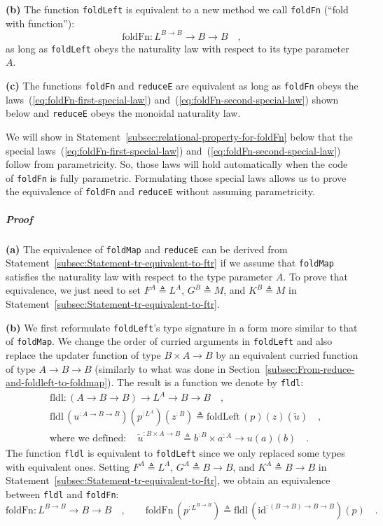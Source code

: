 \textbf{(b)} The function \lstinline!foldLeft! is equivalent to a
new method we call \lstinline!foldFn! (\textsf{``}fold with function\textsf{''}):
\[
\text{foldFn}:L^{B\rightarrow B}\rightarrow B\rightarrow B\quad,
\]
as long as \lstinline!foldLeft! obeys the naturality law with respect
to its type parameter $A$.

\textbf{(c)} The functions \lstinline!foldFn! and \lstinline!reduceE!
are equivalent as long as \lstinline!foldFn! obeys the laws~(\ref{eq:foldFn-first-special-law})
and~(\ref{eq:foldFn-second-special-law}) shown below and \lstinline!reduceE!
obeys the monoidal naturality law. 

We will show in Statement~\ref{subsec:relational-property-for-foldFn}
below that the special laws~(\ref{eq:foldFn-first-special-law})
and~(\ref{eq:foldFn-second-special-law}) follow from parametricity.
So, those laws will hold automatically when the code of \lstinline!foldFn!
is fully parametric. Formulating those special laws allows us to prove
the equivalence of \lstinline!foldFn! and \lstinline!reduceE! without
assuming parametricity.

\subparagraph{Proof}

\textbf{(a)} The equivalence of \lstinline!foldMap! and \lstinline!reduceE!
can be derived from Statement~\ref{subsec:Statement-tr-equivalent-to-ftr}
if we assume that \lstinline!foldMap! satisfies the naturality law
with respect to the type parameter $A$. To prove that equivalence,
we just need to set $F^{A}\triangleq L^{A}$, $G^{B}\triangleq M$,
and $K^{B}\triangleq M$ in Statement~\ref{subsec:Statement-tr-equivalent-to-ftr}.

\textbf{(b)} We first reformulate \lstinline!foldLeft!\textsf{'}s type signature
in a form more similar to that of \lstinline!foldMap!. We change
the order of curried arguments in \lstinline!foldLeft! and also replace
the updater function of type $B\times A\rightarrow B$ by an equivalent
curried function of type $A\rightarrow B\rightarrow B$ (similarly
to what was done in Section~\ref{subsec:From-reduce-and-foldleft-to-foldmap}).
The result is a function we denote by \lstinline!fldl!:
\begin{align*}
 & \text{fldl}:(A\rightarrow B\rightarrow B)\rightarrow L^{A}\rightarrow B\rightarrow B\quad,\\
 & \text{fldl}\,(u^{:A\rightarrow B\rightarrow B})(p^{:L^{A}})(z^{:B})\triangleq\text{foldLeft}\,(p)(z)(\tilde{u})\quad,\\
 & \text{where we defined}:\quad\tilde{u}^{:B\times A\rightarrow B}\triangleq b^{:B}\times a^{:A}\rightarrow u\left(a\right)(b)\quad.
\end{align*}
The function \lstinline!fldl! is equivalent to \lstinline!foldLeft!
since we only replaced some types with equivalent ones. Setting $F^{A}\triangleq L^{A}$,
$G^{A}\triangleq B\rightarrow B$, and $K^{A}\triangleq B\rightarrow B$
in Statement~\ref{subsec:Statement-tr-equivalent-to-ftr}, we obtain
an equivalence between \lstinline!fldl! and \lstinline!foldFn!:
\[
\text{foldFn}:L^{B\rightarrow B}\rightarrow B\rightarrow B\quad,\quad\quad\text{foldFn}\,(p^{:L^{B\rightarrow B}})\triangleq\text{fldl}\,(\text{id}^{:(B\rightarrow B)\rightarrow B\rightarrow B})(p)\quad.
\]

